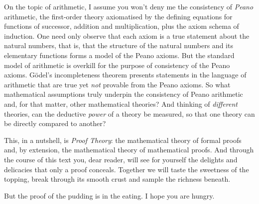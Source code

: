
On the topic of arithmetic, I assume you won't deny me the consistency of \emph{Peano} arithmetic, the first-order theory axiomatised by the defining equations for functions of successor, addition and multiplication, plus the axiom schema of induction.
One need only observe that each axiom is a true statement about the natural numbers, that is, that the structure of the natural numbers and its elementary functions forms a model of the Peano axioms.
But the standard model of arithmetic is overkill for the purpose of consistency of the Peano axioms.
Gödel's incompleteness theorem presents statements in the language of arithmetic that are true yet \emph{not} provable from the Peano axioms.
So what mathematical assumptions truly underpin the consistency of Peano arithmetic and, for that matter, other mathematical theories?
And thinking of \emph{different} theories, 
can the deductive \emph{power} of a theory be measured, so that one theory can be directly compared to another?

This, in a nutshell, is
\emph{Proof Theory}: the mathematical theory of formal proofs and, by extension, the mathematical theory of mathematical proofs.
%
And through the course of this text you, dear reader, will see  for yourself the delights and delicacies that only a proof conceals.
Together we will taste the sweetness of the topping, break through its smooth crust and sample the richness beneath.

But the proof of the pudding is in the eating.
%
I hope you are hungry.

